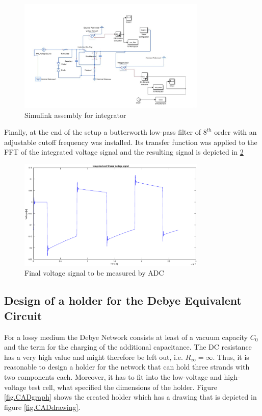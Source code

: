 \begin{figure}[h!tb]
\centerline{\includegraphics[width=0.8\textwidth]{figures/Method/signal_simulation/simulink.eps}}
\caption{Simulink assembly for integrator}
\label{fig.simulink}
\end{figure}

Finally, at the end of the setup a butterworth low-pass filter of $8^{th}$ order with an adjustable cutoff frequency
was installed. Its transfer function was applied to the FFT of the integrated voltage signal and the resulting 
signal is depicted in \ref{fig.finalvolt}


\begin{figure}[h!tb]
\centerline{\includegraphics[width=0.8\textwidth]{figures/Method/signal_simulation/finalvolt.eps}}
\caption{Final voltage signal to be measured by ADC}
\label{fig.finalvolt}
\end{figure}


\subsection{Design of a holder for the Debye Equivalent Circuit}
For a lossy medium the Debye Network consists at least of a vacuum capacity $C_0$ and the term for the charging of the additional capacitance. The DC resistance has a very high value and might therefore be left out, i.e. $R_{\infty}={\infty}$. Thus, it is reasonable to design a holder for the network that can hold three strands with two components each. Moreover, it has to fit into the low-voltage and high-voltage test cell, what specified the dimensions of the holder.  
Figure \ref{fig.CADgraph} shows the created holder which has a drawing that is depicted in figure \ref{fig.CADdrawing}.

